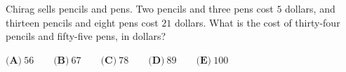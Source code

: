 Chirag sells pencils and pens. Two pencils and three pens cost $5$ dollars, and thirteen pencils and eight pens cost $21$ dollars. What is the cost of thirty-four pencils and fifty-five pens, in dollars?

$\textbf{(A)}\ 56\qquad\textbf{(B)}\ 67\qquad\textbf{(C)}\ 78\qquad\textbf{(D)}\ 89\qquad\textbf{(E)}\ 100$
